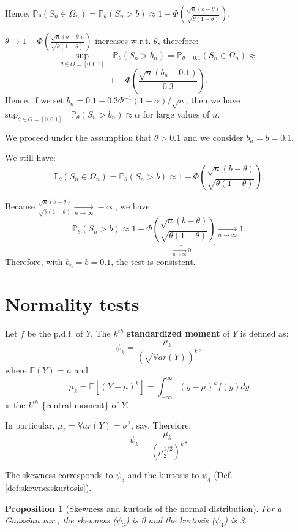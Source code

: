 \documentclass[
  12pt,
]{book}
\newtheorem{proposition}{Proposition}[chapter]
\theoremstyle{definition}
\theoremstyle{definition}
\theoremstyle{definition}
\theoremstyle{definition}
\theoremstyle{remark}
\begin{document}
Hence, \(\mathbb{P}_\theta (S_n \in \Omega_n)=\mathbb{P}_\theta (S_n > b) \approx 1-\Phi\left(\frac{\sqrt{n}(b-\theta)}{\sqrt{\theta(1-\theta)}}\right)\).

\(\theta \rightarrow 1-\Phi\left(\frac{\sqrt{n}(b-\theta)}{\sqrt{\theta(1-\theta)}}\right)\) increases w.r.t. \(\theta\), therefore:
\[
    \underset{\theta \in \Theta=[0,0.1]}{\mbox{sup}} \quad \mathbb{P}_\theta (S_n > b_n) = \mathbb{P}_{\theta=0.1} (S_n \in \Omega_n)\approx\]
\[
    1-\Phi\left(\frac{\sqrt{n}(b_n-0.1)}{0.3}\right).
    \]
Hence, if we set \(b_n = 0.1 + 0.3\Phi^{-1}(1-\alpha)/\sqrt{n}\), then we have \({\mbox{sup}}_{\theta \in \Theta=[0,0.1]} \quad \mathbb{P}_\theta (S_n > b_n) \approx \alpha\) for large values of \(n\).

We proceed under the assumption that \(\theta>0.1\) and we consider \(b_n = b = 0.1\).

We still have:
\[
    \mathbb{P}_\theta (S_n \in \Omega_n)=\mathbb{P}_\theta (S_n > b) \approx 1-\Phi\left(\frac{\sqrt{n}(b-\theta)}{\sqrt{\theta(1-\theta)}}\right).
    \]

Because \(\frac{\sqrt{n}(b-\theta)}{\sqrt{\theta(1-\theta)}} \underset{n \rightarrow \infty}{\rightarrow} -\infty\), we have
\[
    \mathbb{P}_\theta (S_n > b) \approx 1- \underbrace{\Phi\left(\frac{\sqrt{n}(b-\theta)}{\sqrt{\theta(1-\theta)}}\right)}_{\underset{n \rightarrow \infty}{\rightarrow} 0} \underset{n \rightarrow \infty}{\rightarrow} 1.
    \]
Therefore, with \(b_n=b=0.1\), the test is consistent.

\hypertarget{normality-tests}{%
\section{Normality tests}\label{normality-tests}}

Let \(f\) be the p.d.f. of \(Y\). The \(k^{th}\) \textbf{standardized moment} of \(Y\) is defined as:
\[
    \psi_k = \frac{\mu_k}{\left(\sqrt{\mathbb{V}ar(Y)}\right)^k},
    \]
where \(\mathbb{E}(Y)=\mu\) and
\[
    \mu_k = \mathbb{E}[(Y-\mu)^k]= \int_{-\infty}^{\infty} (y-\mu)^k f(y) dy
    \]
is the \(k^{th}\) \{\color{blue}central moment\} of \(Y\).

In particular, \(\mu_2 = \mathbb{V}ar(Y)=\sigma^2\), say. Therefore:
\[
    \psi_k = \frac{\mu_k}{\left(\mu_2^{1/2}\right)^k},
    \]

The skewness corresponds to \(\psi_3\) and the kurtosis to \(\psi_4\) (Def. \ref{def:skewnesskurtosis}).

\begin{proposition}[Skewness and kurtosis of the normal distribution]
\protect\hypertarget{prp:normSkewKurt}{}\label{prp:normSkewKurt}For a Gaussian var., the skewness (\(\psi_3\)) is 0 and the kurtosis (\(\psi_4\)) is 3.
\end{proposition}
\end{document}
